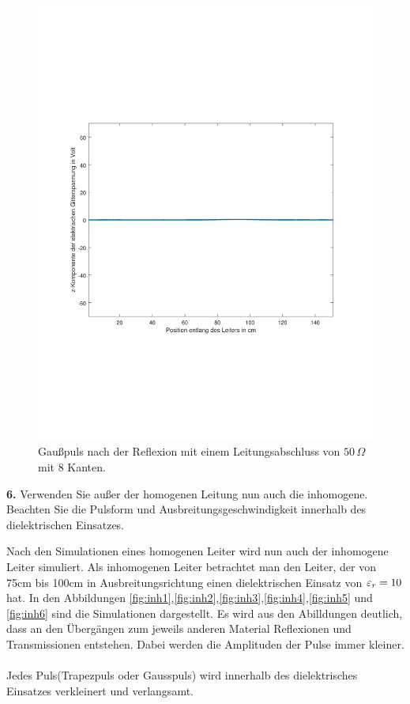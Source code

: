\documentclass[Protokollheft.tex]{subfiles}
\begin{document}
\begin{figure}[ht]
	\centering
	\includegraphics[trim = 20mm 65mm 20mm 65mm, clip,width=0.7\linewidth]{untitled6.pdf}
	\caption{Gaußpuls nach der Reflexion mit einem Leitungsabschluss von $50\,\Omega$ mit 8 Kanten.}\label{fig:gauss6}
\end{figure}


\begin{framed}
	\noindent \textbf{6.} Verwenden Sie außer der homogenen Leitung nun auch die
inhomogene. Beachten Sie die Pulsform und
Ausbreitungsgeschwindigkeit innerhalb des dielektrischen
Einsatzes.\label{exer:inhomogenTLine}
\end{framed}
\noindent
Nach den Simulationen eines homogenen Leiter wird nun auch der inhomogene Leiter simuliert. Als inhomogenen Leiter betrachtet man den Leiter, der von 75cm bis 100cm in Ausbreitungsrichtung einen dielektrischen Einsatz von $\varepsilon_r=10$ hat. In den Abbildungen \ref{fig:inh1},\ref{fig:inh2},\ref{fig:inh3},\ref{fig:inh4},\ref{fig:inh5} und \ref{fig:inh6} sind die Simulationen dargestellt. Es wird aus den Abilldungen deutlich, dass an den Übergängen zum jeweils anderen Material Reflexionen und Transmissionen entstehen. Dabei werden die Amplituden der Pulse immer kleiner.\\ \\
Jedes Puls(Trapezpuls oder Gausspuls) wird innerhalb des dielektrisches Einsatzes verkleinert und verlangsamt.
\end{document}
